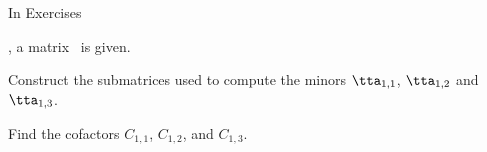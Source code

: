 {\noin In Exercises }
{, a matrix \tta\ is given.
\begin{list}{()}{}
\item	Construct the submatrices used to compute the minors $\tta_{1,1}$, $\tta_{1,2}$ and $\tta_{1,3}$.
\item Find the cofactors $C_{1,1}$, $C_{1,2}$, and $C_{1,3}$.
\end{list}}
